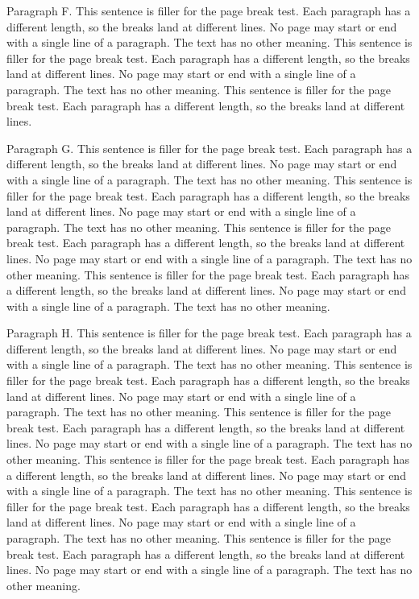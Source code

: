 Paragraph F. This sentence is filler for the page break test. Each paragraph
has a different length, so the breaks land at different lines. No page may
start or end with a single line of a paragraph. The text has no other meaning.
This sentence is filler for the page break test. Each paragraph has a
different length, so the breaks land at different lines. No page may start or
end with a single line of a paragraph. The text has no other meaning. This
sentence is filler for the page break test. Each paragraph has a different
length, so the breaks land at different lines.

Paragraph G. This sentence is filler for the page break test. Each paragraph
has a different length, so the breaks land at different lines. No page may
start or end with a single line of a paragraph. The text has no other meaning.
This sentence is filler for the page break test. Each paragraph has a
different length, so the breaks land at different lines. No page may start or
end with a single line of a paragraph. The text has no other meaning. This
sentence is filler for the page break test. Each paragraph has a different
length, so the breaks land at different lines. No page may start or end with a
single line of a paragraph. The text has no other meaning. This sentence is
filler for the page break test. Each paragraph has a different length, so the
breaks land at different lines. No page may start or end with a single line of
a paragraph. The text has no other meaning.

Paragraph H. This sentence is filler for the page break test. Each paragraph
has a different length, so the breaks land at different lines. No page may
start or end with a single line of a paragraph. The text has no other meaning.
This sentence is filler for the page break test. Each paragraph has a
different length, so the breaks land at different lines. No page may start or
end with a single line of a paragraph. The text has no other meaning. This
sentence is filler for the page break test. Each paragraph has a different
length, so the breaks land at different lines. No page may start or end with a
single line of a paragraph. The text has no other meaning. This sentence is
filler for the page break test. Each paragraph has a different length, so the
breaks land at different lines. No page may start or end with a single line of
a paragraph. The text has no other meaning. This sentence is filler for the
page break test. Each paragraph has a different length, so the breaks land at
different lines. No page may start or end with a single line of a paragraph.
The text has no other meaning. This sentence is filler for the page break
test. Each paragraph has a different length, so the breaks land at different
lines. No page may start or end with a single line of a paragraph. The text
has no other meaning.


